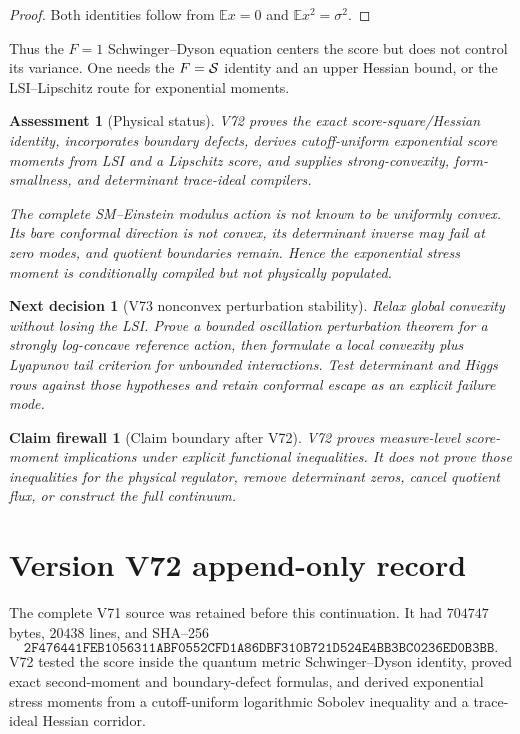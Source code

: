 \documentclass[11pt]{article}
\newtheorem{firewall}[theorem]{Claim firewall}
\newtheorem{decision}[theorem]{Next decision}
\newtheorem{assessment}[theorem]{Assessment}
\theoremstyle{remark}
\begin{document}
\begin{proof}
Both identities follow from
\(\mathbb E x=0\) and \(\mathbb E x^2=\sigma^2\).
\end{proof}

Thus the \(F=1\) Schwinger--Dyson equation centers the score but
does not control its variance.  One needs the \(F={\cal S}\)
identity and an upper Hessian bound, or the LSI--Lipschitz route for
exponential moments.

\begin{assessment}[Physical status]
\label{ass:v15v72-status}
V72 proves the exact score-square/Hessian identity, incorporates
boundary defects, derives cutoff-uniform exponential score moments
from LSI and a Lipschitz score, and supplies strong-convexity,
form-smallness, and determinant trace-ideal compilers.

The complete SM--Einstein modulus action is not known to be
uniformly convex.  Its bare conformal direction is not convex, its
determinant inverse may fail at zero modes, and quotient boundaries
remain.  Hence the exponential stress moment is conditionally
compiled but not physically populated.
\end{assessment}

\begin{decision}[V73 nonconvex perturbation stability]
\label{dec:v15v72-next}
Relax global convexity without losing the LSI.  Prove a bounded
oscillation perturbation theorem for a strongly log-concave
reference action, then formulate a local convexity plus Lyapunov
tail criterion for unbounded interactions.  Test determinant and
Higgs rows against those hypotheses and retain conformal escape as
an explicit failure mode.
\end{decision}

\begin{firewall}[Claim boundary after V72]
\label{fire:v15v72}
V72 proves measure-level score-moment implications under explicit
functional inequalities.  It does not prove those inequalities for
the physical regulator, remove determinant zeros, cancel quotient
flux, or construct the full continuum.
\end{firewall}

\section*{Version V72 append-only record}
The complete V71 source was retained before this continuation.  It
had \(704747\) bytes, \(20438\) lines, and SHA--256
\[
 \texttt{2F476441FEB1056311ABF0552CFD1A86DBF310B721D524E4BB3BC0236ED0B3BB}.
\]
V72 tested the score inside the quantum metric
Schwinger--Dyson identity, proved exact second-moment and
boundary-defect formulas, and derived exponential stress moments
from a cutoff-uniform logarithmic Sobolev inequality and a
trace-ideal Hessian corridor.
\end{document}
